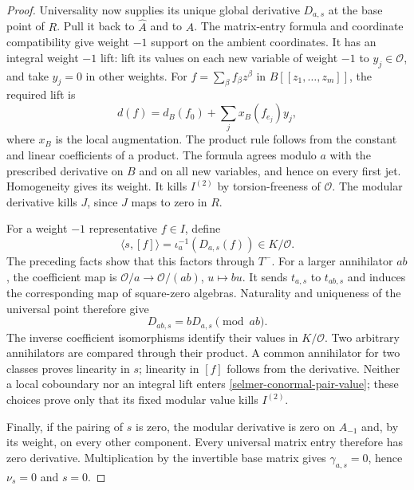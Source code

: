 \begin{proof}
Universality now supplies its unique global derivative $D_{a,s}$ at
the base point of $R$. Pull it back to $\widehat A$ and to $A$.
The matrix-entry formula and coordinate compatibility give weight
$-1$ support on the ambient coordinates.
It has an integral weight $-1$ lift: lift its values on each new
variable of weight $-1$ to $y_j\in\mathcal O$, and take $y_j=0$
in other weights. For $f=\sum_\beta f_\beta z^\beta$ in
$B[[z_1,\ldots,z_m]]$, the required lift is
\[
 d(f)=d_B(f_0)+\sum_j x_B(f_{e_j})y_j,
\]
where $x_B$ is the local augmentation. The product rule follows
from the constant and linear coefficients of a product. The formula
agrees modulo $a$ with the prescribed derivative on $B$ and on all
new variables, and hence on every first jet. Homogeneity gives its
weight. It kills $I^{(2)}$ by torsion-freeness of $\mathcal O$.
The modular derivative kills $J$, since $J$ maps to zero in $R$.

For a weight $-1$ representative $f\in I$, define
\begin{equation}\label{selmer-conormal-pair-value}
 \langle s,[f]\rangle=\iota_a^{-1}(D_{a,s}(f))\in K/\mathcal O.
\end{equation}
The preceding facts show that this factors through $T^-$.
For a larger annihilator $ab$, the coefficient map is
$\mathcal O/a\to\mathcal O/(ab)$, $u\mapsto bu$.
It sends $t_{a,s}$ to $t_{ab,s}$ and induces the corresponding map
of square-zero algebras. Naturality and uniqueness of the universal
point therefore give
\[
                       D_{ab,s}=bD_{a,s}\pmod {ab}.
\]
The inverse coefficient isomorphisms identify their values in
$K/\mathcal O$. Two arbitrary annihilators are compared through
their product. A common annihilator for two classes proves linearity
in $s$; linearity in $[f]$ follows from the derivative. Neither a
local coboundary nor an integral lift enters
\eqref{selmer-conormal-pair-value}; these choices prove only that
its fixed modular value kills $I^{(2)}$.

Finally, if the pairing of $s$ is zero, the modular derivative is
zero on $A_{-1}$ and, by its weight, on every other component.
Every universal matrix entry therefore has zero derivative.
Multiplication by the invertible base matrix gives
$\gamma_{a,s}=0$, hence $\nu_s=0$ and $s=0$.
\end{proof}

